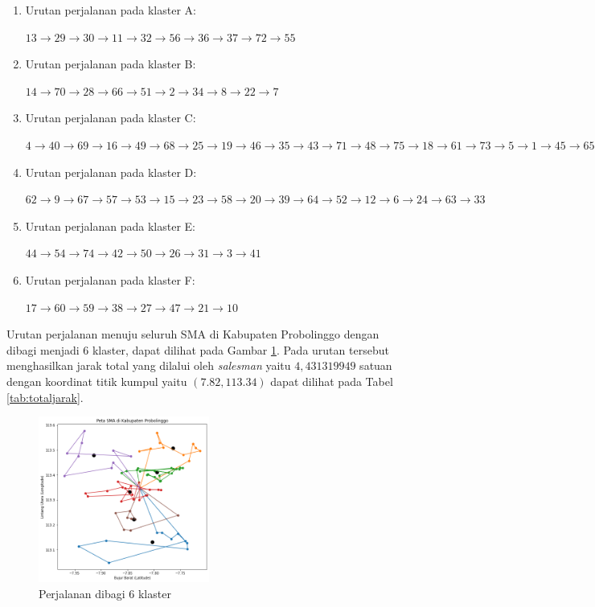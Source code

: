 \begin{enumerate}

\item Urutan perjalanan pada klaster A:

$13\rightarrow29\rightarrow30\rightarrow11\rightarrow32\rightarrow56\rightarrow36\rightarrow37\rightarrow72\rightarrow55$

\item Urutan perjalanan pada klaster B:

$14\rightarrow70\rightarrow28\rightarrow66\rightarrow51\rightarrow2\rightarrow34\rightarrow8\rightarrow22\rightarrow7$

\item Urutan perjalanan pada klaster C:

$4\rightarrow40\rightarrow69\rightarrow16\rightarrow49\rightarrow68\rightarrow25\rightarrow19\rightarrow46\rightarrow35\rightarrow43\rightarrow71\rightarrow48\rightarrow75\rightarrow18\rightarrow61\rightarrow73\rightarrow5\rightarrow1\rightarrow45\rightarrow65$

\item Urutan perjalanan pada klaster D:

$62\rightarrow9\rightarrow67\rightarrow57\rightarrow53\rightarrow15\rightarrow23\rightarrow58\rightarrow20\rightarrow39\rightarrow64\rightarrow52\rightarrow12\rightarrow6\rightarrow24\rightarrow63\rightarrow33$

\item Urutan perjalanan pada klaster E:

$44\rightarrow54\rightarrow74\rightarrow42\rightarrow50\rightarrow26\rightarrow31\rightarrow3\rightarrow41$

\item Urutan perjalanan pada klaster F:

$17\rightarrow60\rightarrow59\rightarrow38\rightarrow27\rightarrow47\rightarrow21\rightarrow10$

\end{enumerate}

Urutan perjalanan menuju seluruh SMA di Kabupaten Probolinggo dengan dibagi menjadi 6 klaster, dapat dilihat pada Gambar \ref{fig:hasil_mtsp6}. Pada urutan tersebut menghasilkan jarak total yang dilalui oleh \textit{salesman} yaitu $4,431319949$ satuan dengan koordinat titik kumpul yaitu $(7.82, 113.34)$ dapat dilihat pada Tabel \ref{tab:totaljarak}.

\begin{figure}[H]
\centering
\includegraphics[width=0.5\textwidth]{Gambar/hasil_mtsp/6}
\caption{Perjalanan dibagi 6 klaster}
\label{fig:hasil_mtsp6}
\end{figure}


